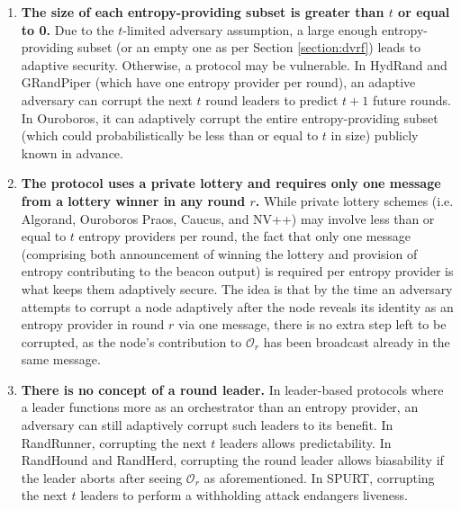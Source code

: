 \documentclass[letterpaper,twocolumn,10pt]{article}
\theoremstyle{definition}
\theoremstyle{remark}
\begin{document}
\begin{enumerate}
\item \textbf{The size of each entropy-providing subset is greater than $t$ or equal to 0.} Due to the $t$-limited adversary assumption, a large enough entropy-providing subset (or an empty one as per Section \ref{section:dvrf}) leads to adaptive security. Otherwise, a protocol may be vulnerable. In HydRand and GRandPiper (which have one entropy provider per round), an adaptive adversary can corrupt the next $t$ round leaders to predict $t + 1$ future rounds. In Ouroboros, it can adaptively corrupt the entire entropy-providing subset (which could probabilistically be less than or equal to $t$ in size) publicly known in advance.
\item \textbf{The protocol uses a private lottery and requires only one message from a lottery winner in any round $r$.} While private lottery schemes (i.e. Algorand, Ouroboros Praos, Caucus, and NV++) may involve less than or equal to $t$ entropy providers per round, the fact that only one message (comprising both announcement of winning the lottery and provision of entropy contributing to the beacon output) is required per entropy provider is what keeps them adaptively secure. The idea is that by the time an adversary attempts to corrupt a node adaptively after the node reveals its identity as an entropy provider in round $r$ via one message, there is no extra step left to be corrupted, as the node's contribution to $\mathcal{O}_r$ has been broadcast already in the same message.
\item \textbf{There is no concept of a round leader.} In leader-based protocols where a leader functions more as an orchestrator than an entropy provider, an adversary can still adaptively corrupt such leaders to its benefit. In RandRunner, corrupting the next $t$ leaders allows predictability. In RandHound and RandHerd, corrupting the round leader allows biasability if the leader aborts after seeing $\mathcal{O}_r$ as aforementioned. In SPURT, corrupting the next $t$ leaders to perform a withholding attack endangers liveness.
\end{enumerate}
\end{document}
